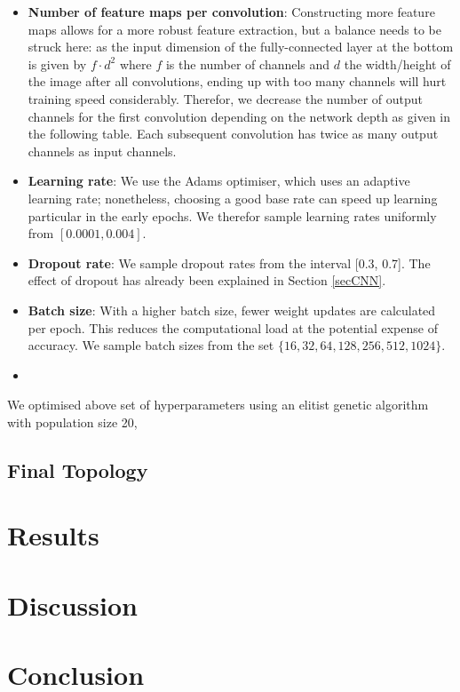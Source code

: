 \documentclass[british,12p]{article}
\begin{document}
\begin{itemize}
    	\item \textbf{Number of feature maps per convolution}: Constructing more feature maps allows for a more robust feature extraction, but a balance needs to be struck here: as the input dimension of the fully-connected layer at the bottom is given by $f \cdot d^2$ where $f$ is the number of channels and $d$ the width/height of the image after all convolutions, ending up with too many channels will hurt training speed considerably. Therefor, we decrease the number of output channels for the first convolution depending on the network depth as given in the following table. Each subsequent convolution has twice as many output channels as input channels. 
    	\item \textbf{Learning rate}: We use the Adams optimiser, which uses an adaptive learning rate; nonetheless, choosing a good base rate can speed up learning particular in the early epochs. We therefor sample learning rates uniformly from $[0.0001, 0.004]$.
    	\item \textbf{Dropout rate}: We sample dropout rates from the interval [0.3, 0.7]. The effect of dropout has already been explained in Section \ref{secCNN}.
    	\item \textbf{Batch size}: With a higher batch size, fewer weight updates are calculated per epoch. This reduces the computational load at the potential expense of accuracy. We sample batch sizes from the set $\{16, 32, 64, 128, 256, 512, 1024\}$.
    	\item 
    \end{itemize}
    
    We optimised above set of hyperparameters using an elitist genetic algorithm  with population size 20, 
    
    \subsection{Final Topology}

    \section{Results}
    \section{Discussion}
    \section{Conclusion}
           
            
      \printbibliography
    
\end{document}
